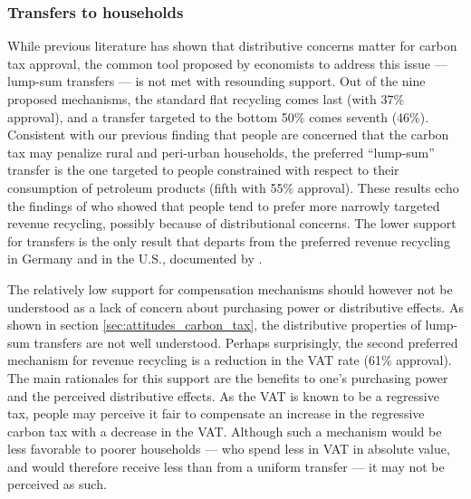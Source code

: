 \documentclass[english,5p,authoryear]{elsarticle}
\begin{document}
        \subsubsection{Transfers to households}
While previous literature has shown that distributive concerns matter for carbon tax approval, the common tool proposed by economists to address this issue --- lump-sum transfers --- is not met with resounding support. Out of the nine proposed mechanisms, the standard flat recycling comes last (with 37\% approval), and a transfer targeted to the bottom 50\% comes seventh (46\%). Consistent with our previous finding that people are concerned that the carbon tax may penalize rural and peri-urban households, the preferred ``lump-sum'' transfer is the one targeted to people constrained with respect to their consumption of petroleum products (fifth with 55\% approval). These results echo the findings of \citet{kallbekken_et_al_2011} who showed that people tend to prefer more narrowly targeted revenue recycling, possibly because of distributional concerns. The lower support for transfers is the only result that departs from the preferred revenue recycling in Germany and in the U.S., documented by \citet{beiser-mcgrath_could_2019}.%

The relatively low support for compensation mechanisms should however not be understood as a lack of concern about purchasing power or distributive effects. As shown in section \ref{sec:attitudes_carbon_tax}, the distributive properties of lump-sum transfers are not well understood. Perhaps surprisingly, the second preferred mechanism for revenue recycling is a reduction in the VAT rate (61\% approval). The main rationales for this support are the benefits to one's purchasing power and the perceived distributive effects. As the VAT is known to be a regressive tax, people may perceive it fair to compensate an increase in the regressive carbon tax with a decrease in the VAT. Although such a mechanism would be less favorable to poorer households --- who spend less in VAT in absolute value, and would therefore receive less than from a uniform transfer --- it may not be perceived as such. %
\end{document}
